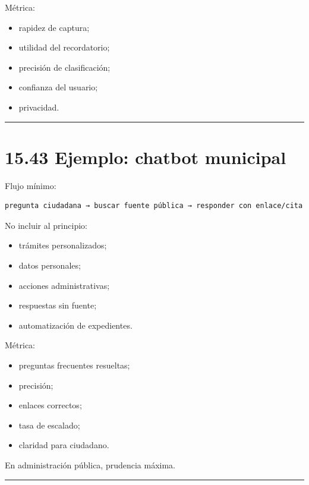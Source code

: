 Métrica:

\begin{itemize}
\tightlist
\item
  rapidez de captura;
\item
  utilidad del recordatorio;
\item
  precisión de clasificación;
\item
  confianza del usuario;
\item
  privacidad.
\end{itemize}

\begin{center}\rule{0.5\linewidth}{0.5pt}\end{center}

\section{15.43 Ejemplo: chatbot
municipal}\label{ejemplo-chatbot-municipal}

Flujo mínimo:

\begin{lstlisting}
pregunta ciudadana → buscar fuente pública → responder con enlace/cita
\end{lstlisting}

No incluir al principio:

\begin{itemize}
\tightlist
\item
  trámites personalizados;
\item
  datos personales;
\item
  acciones administrativas;
\item
  respuestas sin fuente;
\item
  automatización de expedientes.
\end{itemize}

Métrica:

\begin{itemize}
\tightlist
\item
  preguntas frecuentes resueltas;
\item
  precisión;
\item
  enlaces correctos;
\item
  tasa de escalado;
\item
  claridad para ciudadano.
\end{itemize}

En administración pública, prudencia máxima.

\begin{center}\rule{0.5\linewidth}{0.5pt}\end{center}


